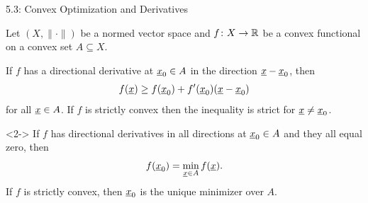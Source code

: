 \documentclass[10pt,letterpaper,english]{beamer}
\begin{document}
\begin{frame}{5.3: Convex Optimization and Derivatives}

\begin{minipage}{0.55\textwidth}
Let $(X,\|\cdot\|)$ be a normed vector space and $f \colon X \rightarrow \mathbb{R}$ be a convex functional on a convex set $A \subseteq X$.
\end{minipage}
\begin{minipage}{0.44\textwidth}\hspace{3mm}
\end{minipage}

\begin{theorem}
If $f$ has a directional derivative  at $\underline{x}_0 \in A$ in the direction $\underline{x}-\underline{x}_0$, then \vspace{-1mm}
\[ f(\vecnot{x}) \geq f(\vecnot{x}_0) + f'(\vecnot{x}_0)(\vecnot{x}-\vecnot{x}_0) \vspace{-1mm} \]
for all $\underline{x}\in A$.
If $f$ is strictly convex then the inequality is strict for $\underline{x}\neq \underline{x}_0$.
\end{theorem}

\vspace{1mm}

\begin{corollary}<2->
If $f$ has directional derivatives in all directions at $\underline{x}_0 \in A$ and they all equal zero, then \vspace{-2mm}
\[ f(\vecnot{x}_0) = \min_{\vecnot{x}\in A} f(\vecnot{x}). \vspace{-2mm} \]
If $f$ is strictly convex, then $\underline{x}_0$ is the unique minimizer over $A$.
\end{corollary}


\end{frame}
\end{document}
